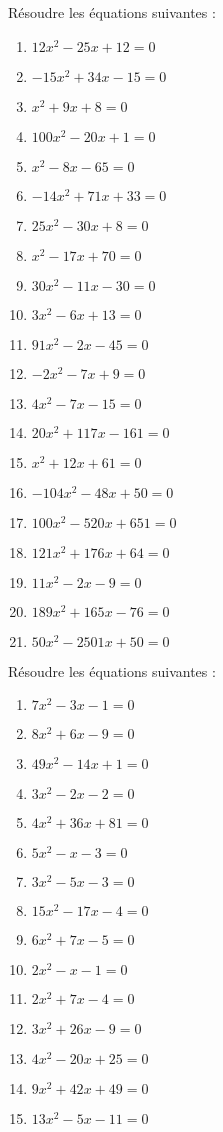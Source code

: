 \begin{exercice}
Résoudre les équations suivantes :
\begin{multicols}{2}
\begin{enumerate}
\item $12{{x}^{2}}-25x+12=0$ 
\item $-15{{x}^{2}}+34x-15=0$ 
\item ${{x}^{2}}+9x+8=0$ 
\item $100{{x}^{2}}-20x+1=0$ 
\item ${{x}^{2}}-8x-65=0$ 
\item $-14{{x}^{2}}+71x+33=0$ 
\item $25{{x}^{2}}-30x+8=0$ 
\item ${{x}^{2}}-17x+70=0$
\item $30{{x}^{2}}-11x-30=0$
\item $3{{x}^{2}}-6x+13=0$
\item $91{{x}^{2}}-2x-45=0$
\item $-2{{x}^{2}}-7x+9=0$
\item $4{{x}^{2}}-7x-15=0$
\item $20{{x}^{2}}+117x-161=0$
\item ${{x}^{2}}+12x+61=0$
\item $-104{{x}^{2}}-48x+50=0$
\item $100{{x}^{2}}-520x+651=0$
\item $121{{x}^{2}}+176x+64=0$
\item $11{{x}^{2}}-2x-9=0$
\item $189{{x}^{2}}+165x-76=0$
\item $50{{x}^{2}}-2501x+50=0$
\end{enumerate}
\end{multicols}
\end{exercice}

\begin{exercice}
Résoudre les équations suivantes :
\begin{multicols}{2}
\begin{enumerate}
\item $7{{x}^{2}}-3x-1=0$ 
\item $8{{x}^{2}}+6x-9=0$ 
\item $49{{x}^{2}}-14x+1=0$	 
\item $3{{x}^{2}}-2x-2=0$ 
\item $4{{x}^{2}}+36x+81=0$ 
\item $5{{x}^{2}}-x-3=0$
\item $3{{x}^{2}}-5x-3=0$
\item $15{{x}^{2}}-17x-4=0$
\item $6{{x}^{2}}+7x-5=0$
\item $2{{x}^{2}}-x-1=0$
\item $2{{x}^{2}}+7x-4=0$
\item $3{{x}^{2}}+26x-9=0$
\item $4{{x}^{2}}-20x+25=0$
\item $9{{x}^{2}}+42x+49=0$
\item $13{{x}^{2}}-5x-11=0$
\end{enumerate}
\end{multicols}
\end{exercice}

